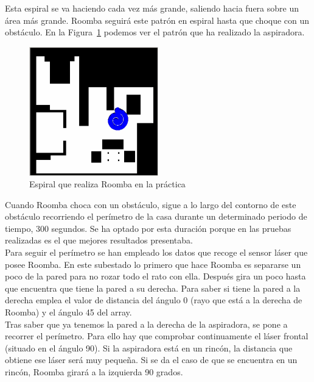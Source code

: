 Esta espiral se va haciendo cada vez más grande, saliendo hacia fuera sobre un área más grande. Roomba seguirá este patrón en espiral hasta que choque con un obstáculo. En la Figura~\ref{fig.Espiral_Roomba} podemos ver el patrón que ha realizado la aspiradora.\\

\begin{figure}[H]
  \begin{center}
    \includegraphics[width=0.5\textwidth]{figures/Vacuum/Espiral_Roomba.png}
		\caption{Espiral que realiza Roomba en la práctica}
		\label{fig.Espiral_Roomba}
		\end{center}
\end{figure}

Cuando Roomba choca con un obstáculo, sigue a lo largo del contorno de este obstáculo recorriendo el perímetro de la casa durante un determinado periodo de tiempo, 300 segundos. Se ha optado por esta duración porque en las pruebas realizadas es el que mejores resultados presentaba.\\

Para seguir el perímetro se han empleado los datos que recoge el sensor láser que posee Roomba. En este subestado lo primero que hace Roomba es separarse un poco de la pared para no rozar todo el rato con ella. Después gira un poco hasta que encuentra que tiene la pared a su derecha. Para saber si tiene la pared a la derecha emplea el valor de distancia del ángulo 0 (rayo que está a la derecha de Roomba) y el ángulo 45 del array.\\

Tras saber que ya tenemos la pared a la derecha de la aspiradora, se pone a recorrer el perímetro. Para ello hay que comprobar continuamente el láser frontal (situado en el ángulo 90). Si la aspiradora está en un rincón, la distancia que obtiene ese láser será muy pequeña. Si se da el caso de que se encuentra en un rincón, Roomba girará a la izquierda 90 grados. \\


